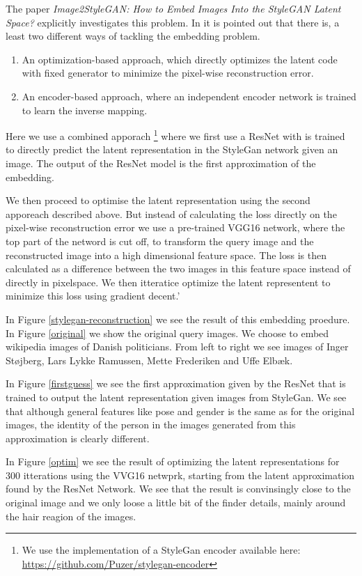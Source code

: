 The paper \textit{Image2StyleGAN: How to Embed Images Into the StyleGAN Latent Space?}\cite{Image2StyleGAN} explicitly investigates this problem.
In \cite{interfacegan} it is pointed out that there is, a least two different ways of tackling the embedding problem.

\begin{enumerate}
    \item An optimization-based
    approach, which directly optimizes the latent code with fixed generator to minimize the pixel-wise reconstruction error.
    \item An encoder-based approach, where an independent encoder network is trained to learn the inverse mapping. 
\end{enumerate}

Here we use a combined apporach \footnote{We use the implementation of a StyleGan encoder available here: \url{https://github.com/Puzer/stylegan-encoder}}
where we first use a ResNet with is trained to directly predict the latent representation in the StyleGan network given an image. The output of the ResNet model is the first approximation of the embedding. 

We then proceed to optimise the latent representation using the second apporeach described above. But instead of calculating the loss directly on the pixel-wise reconstruction error we use a pre-trained VGG16 network, where the top part of the netword is cut off,  to transform the query image and the reconstructed image into a high dimensional feature space. The loss is then calculated as a difference between the two images in this feature space instead of directly in pixelspace. We then itteratice optimize the latent representent to minimize this loss using gradient decent.'

In Figure \ref{stylegan-reconstruction} we see the result of this embedding proedure. In Figure \ref{original} we show the original query images. We choose to embed wikipedia images of Danish politicians. From left to right we see images of Inger Støjberg, Lars Lykke Ramussen, Mette Frederiken and Uffe Elbæk. 

In Figure \ref{firstguess} we see the first approximation given by the ResNet that is trained to output the latent representation given images from StyleGan. We see that although general features like pose and gender is the same as for the original images, the identity of the person in the images generated from this approximation is clearly different. 

In Figure \ref{optim} we see the result of optimizing the latent representations for 300 itterations using the VVG16 netwprk, starting from the latent approximation found by the ResNet Network. We see that the result is convinsingly close to the original image and we only loose a little bit of the finder details, mainly around the hair reagion of the images.

